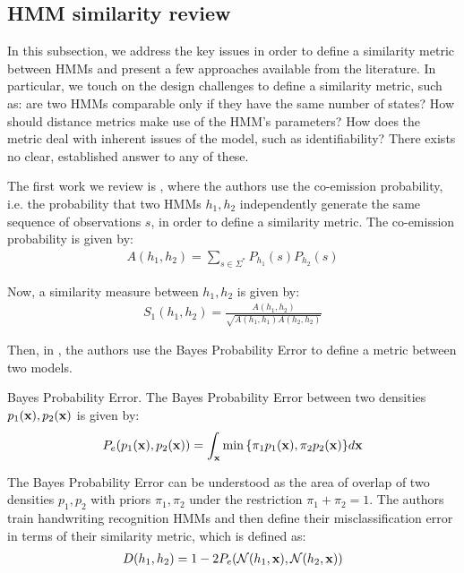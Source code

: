 \documentclass[../main.tex]{subfiles}
\begin{document}
\subsection{HMM similarity review} \label{subsection_hmmsimreview}
In this subsection, we address the key issues in order to define a similarity metric between HMMs and present a few approaches available from the literature. In particular, we touch on the design challenges to define a similarity metric, such as: are two HMMs comparable only if they have the same number of states? How should distance metrics make use of the HMM's parameters? How does the metric deal with inherent issues of the model, such as identifiability? There exists no clear, established answer to any of these.
\par The first work we review is \cite{Lyngs1999}, where the authors use the co-emission probability, i.e. the probability that two HMMs $h_1, h_2$ independently generate the same sequence of observations $s$, in order to define a similarity metric. The co-emission probability is given by:
\begin{align*}
A(h_1, h_2) = \sum_{s\in \Sigma^*}P_{h_1}(s)P_{h_2}(s)
\end{align*}
\par Now, a similarity measure between $h_1, h_2$ is given by:
\begin{align*}
S_1(h_1, h_2) = \frac{A(h_1, h_2)}{\sqrt{A(h_1, h_1)A(h_2, h_2)}}
\end{align*}
\par Then, in \cite{Bahlmann2001}, the authors use the Bayes Probability Error to define a metric between two models. 
\begin{definition}{Bayes Probability Error.} \label{def_bpe}
The Bayes Probability Error between two densities $p_1(\mathbf{x}), p_2(\mathbf{x})$ is given by:
\begin{align*}
P_e(p_1(\mathbf{x}), p_2(\mathbf{x})) = \int_{\mathbf{x}}\min{\{\pi_1p_1(\mathbf{x}), \pi_2p_2(\mathbf{x})\}}d\mathbf{x}
\end{align*}
\end{definition}
\par The Bayes Probability Error can be understood as the area of overlap of two densities $p_1, p_2$ with priors $\pi_1, \pi_2$ under the restriction $\pi_1+\pi_2 = 1$. The authors train handwriting recognition HMMs and then define their misclassification error in terms of their similarity metric, which is defined as:
\begin{align*}
D(h_1, h_2) = 1 - 2P_e{(\mathcal{N}(h_1, \mathbf{x}), \mathcal{N}(h_2, \mathbf{x}))}
\end{align*}
\end{document}
